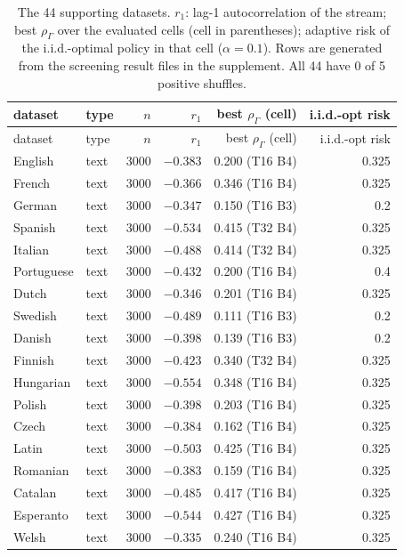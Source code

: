 \documentclass{article}
\theoremstyle{plain}
\theoremstyle{definition}
\theoremstyle{remark}
\newcommand{\rhoG}{\rho_\Gamma}
\begin{document}
\begin{longtable}{llrrrr}
\caption{The 44 supporting datasets. $r_1$: lag-1 autocorrelation of the stream; best $\rhoG$ over the evaluated cells (cell in parentheses); adaptive risk of the i.i.d.-optimal policy in that cell ($\alpha=0.1$). Rows are generated from the screening result files in the supplement. All 44 have 0 of 5 positive shuffles.}
\label{tab:real35}\\
\toprule
dataset & type & $n$ & $r_1$ & best $\rhoG$ (cell) & i.i.d.-opt risk\\
\midrule
\endfirsthead
\toprule
dataset & type & $n$ & $r_1$ & best $\rhoG$ (cell) & i.i.d.-opt risk\\
\midrule
\endhead
English & text & 3000 & $-0.383$ & 0.200 (T16 B4) & 0.325\\
French & text & 3000 & $-0.366$ & 0.346 (T16 B4) & 0.325\\
German & text & 3000 & $-0.347$ & 0.150 (T16 B3) & 0.2\\
Spanish & text & 3000 & $-0.534$ & 0.415 (T32 B4) & 0.325\\
Italian & text & 3000 & $-0.488$ & 0.414 (T32 B4) & 0.325\\
Portuguese & text & 3000 & $-0.432$ & 0.200 (T16 B4) & 0.4\\
Dutch & text & 3000 & $-0.346$ & 0.201 (T16 B4) & 0.325\\
Swedish & text & 3000 & $-0.489$ & 0.111 (T16 B3) & 0.2\\
Danish & text & 3000 & $-0.398$ & 0.139 (T16 B3) & 0.2\\
Finnish & text & 3000 & $-0.423$ & 0.340 (T32 B4) & 0.325\\
Hungarian & text & 3000 & $-0.554$ & 0.348 (T16 B4) & 0.325\\
Polish & text & 3000 & $-0.398$ & 0.203 (T16 B4) & 0.325\\
Czech & text & 3000 & $-0.384$ & 0.162 (T16 B4) & 0.325\\
Latin & text & 3000 & $-0.503$ & 0.425 (T16 B4) & 0.325\\
Romanian & text & 3000 & $-0.383$ & 0.159 (T16 B4) & 0.325\\
Catalan & text & 3000 & $-0.485$ & 0.417 (T16 B4) & 0.325\\
Esperanto & text & 3000 & $-0.544$ & 0.427 (T16 B4) & 0.325\\
Welsh & text & 3000 & $-0.335$ & 0.240 (T16 B4) & 0.325\\

\end{longtable}
\end{document}
